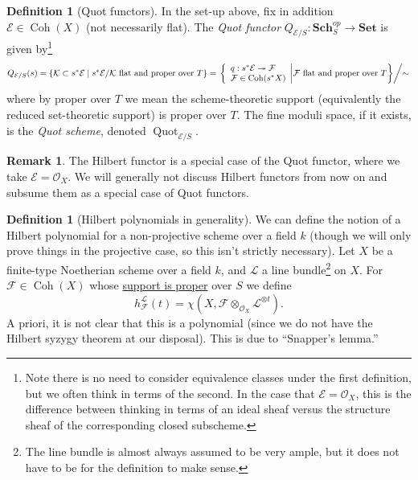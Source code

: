 \documentclass[10pt]{article}
\theoremstyle{definition}
\newtheorem{exmp}[thm]{Example}
\newtheorem{defn}[thm]{Definition}
\newtheorem{rmk}[thm]{Remark}
\DeclareMathOperator{\Coh}{Coh}
\DeclareMathOperator{\Spec}{Spec}
\DeclareMathOperator{\Quot}{Quot}
\newcommand{\cat}{\mathbf}
\newcommand{\OO}{\mathcal{O}}
\newcommand{\LL}{\mathcal{L}}
\begin{document}
\begin{defn}[Quot functors]
In the set-up above, fix in addition $\mathcal{E} \in \Coh(X)$ (not necessarily flat).  The \emph{Quot functor} $Q_{\mathcal{E}/S}: \cat{Sch}_S^{op} \rightarrow \cat{Set}$ is given by\footnote{Note there is no need to consider equivalence classes under the first definition, but we often think in terms of the second.  In the case that $\mathcal{E} = \OO_X$, this is the difference between thinking in terms of an ideal sheaf versus the structure sheaf of the corresponding closed subscheme.}
$$Q_{\mathcal{E}/S}(s)  = \{ \mathcal{K} \subset s^* \mathcal{E} \mid s^*\mathcal{E}/\mathcal{K} \text{ flat and proper over } T\} = 
\left. \left\{ \begin{array}{l}  q: s^* \mathcal{E} \twoheadrightarrow \mathcal{F} \\ \mathcal{F} \in \Coh(s^* X) \end{array} \middle| \mathcal{F} \text{ flat and proper over } T  \right\}  \middle/ \sim  \right.$$
where by proper over $T$ we mean the scheme-theoretic support (equivalently the reduced set-theoretic support) is proper over $T$.  The fine moduli space, if it exists, is the \emph{Quot scheme}, denoted $\Quot_{\mathcal{E}/S}$.
\end{defn}

\begin{rmk}
The Hilbert functor is a special case of the Quot functor, where we take $\mathcal{E} = \OO_X$.  We will generally not discuss Hilbert functors from now on and subsume them as a special case of Quot functors.
\end{rmk}


\begin{defn}[Hilbert polynomials in generality]
We can define the notion of a Hilbert polynomial for a non-projective scheme over a field $k$ (though we will only prove things in the projective case, so this isn't strictly necessary).  Let $X$ be a finite-type Noetherian scheme over a field $k$, and $\mathcal{L}$ a line bundle\footnote{The line bundle is almost always assumed to be very ample, but it does not have to be for the definition to make sense.} on $X$.  For $\mathcal{F} \in \Coh(X)$ whose \underline{support is proper} over $S$ we define
$$h^{\LL}_{\mathcal{F}}(t) = \chi(X, \mathcal{F} \otimes_{\OO_X} \mathcal{L}^{\otimes t}).$$
A priori, it is not clear that this is a polynomial (since we do not have the Hilbert syzygy theorem at our disposal).  This is due to ``Snapper's lemma.''
\end{defn}
\end{document}
